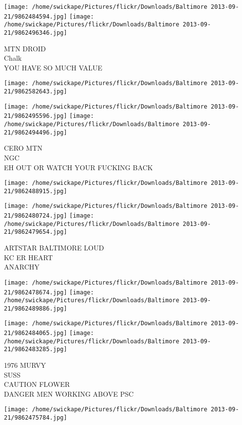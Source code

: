 \documentclass[10pt,letterpaper]{article}
\begin{document}
\vspace{0.25in}
\texttt{[image: /home/swickape/Pictures/flickr/Downloads/Baltimore 2013-09-21/9862484594.jpg]}
\texttt{[image: /home/swickape/Pictures/flickr/Downloads/Baltimore 2013-09-21/9862496346.jpg]}

MTN DROID\\
Chalk\\
YOU HAVE SO MUCH VALUE
\pagebreak

\texttt{[image: /home/swickape/Pictures/flickr/Downloads/Baltimore 2013-09-21/9862582643.jpg]}

\vspace{0.25in}
\texttt{[image: /home/swickape/Pictures/flickr/Downloads/Baltimore 2013-09-21/9862495596.jpg]}
\texttt{[image: /home/swickape/Pictures/flickr/Downloads/Baltimore 2013-09-21/9862494496.jpg]}

CERO MTN\\
NGC\\
EH OUT OR WATCH YOUR FUCKING BACK
\pagebreak

\texttt{[image: /home/swickape/Pictures/flickr/Downloads/Baltimore 2013-09-21/9862488915.jpg]}

\vspace{0.25in}
\texttt{[image: /home/swickape/Pictures/flickr/Downloads/Baltimore 2013-09-21/9862480724.jpg]}
\texttt{[image: /home/swickape/Pictures/flickr/Downloads/Baltimore 2013-09-21/9862479654.jpg]}

ARTSTAR BALTIMORE LOUD\\
KC ER HEART\\
ANARCHY
\pagebreak

\texttt{[image: /home/swickape/Pictures/flickr/Downloads/Baltimore 2013-09-21/9862478674.jpg]}
\texttt{[image: /home/swickape/Pictures/flickr/Downloads/Baltimore 2013-09-21/9862489886.jpg]}

\texttt{[image: /home/swickape/Pictures/flickr/Downloads/Baltimore 2013-09-21/9862484065.jpg]}
\texttt{[image: /home/swickape/Pictures/flickr/Downloads/Baltimore 2013-09-21/9862483285.jpg]}

1976 MURVY\\
SUSS\\
CAUTION FLOWER\\
DANGER MEN WORKING ABOVE PSC
\pagebreak

\texttt{[image: /home/swickape/Pictures/flickr/Downloads/Baltimore 2013-09-21/9862475784.jpg]}
\end{document}
